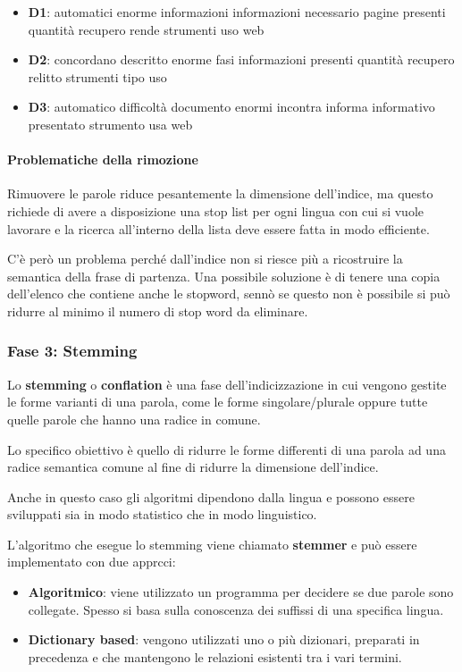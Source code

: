 \begin{itemize}
	\item \textbf{D1}: automatici enorme informazioni informazioni necessario pagine presenti quantità recupero rende strumenti uso web 
	\item \textbf{D2}: concordano descritto enorme fasi informazioni presenti quantità recupero relitto strumenti tipo uso
	\item \textbf{D3}: automatico difficoltà documento enormi incontra informa informativo presentato strumento usa web
\end{itemize}

\paragraph{Problematiche della rimozione}

Rimuovere le parole riduce pesantemente la dimensione dell'indice, ma questo richiede di avere a disposizione una stop list per ogni lingua con cui si vuole lavorare e la ricerca all'interno della lista deve essere fatta in modo efficiente.

C'è però un problema perché dall'indice non si riesce più a ricostruire la semantica della frase di partenza. Una possibile soluzione è di tenere una copia dell'elenco che contiene anche le stopword, sennò se questo non è possibile si può ridurre al minimo il numero di stop word da eliminare.

\subsubsection{Fase 3: Stemming}

Lo \textbf{stemming} o \textbf{conflation} è una fase dell'indicizzazione in cui vengono gestite le forme varianti di una parola, come le forme singolare/plurale oppure tutte quelle parole che hanno una radice in comune.

Lo specifico obiettivo è quello di ridurre le forme differenti di una parola ad una radice semantica comune al fine di ridurre la dimensione dell'indice.

Anche in questo caso gli algoritmi dipendono dalla lingua e possono essere sviluppati sia in modo statistico che in modo linguistico.

L'algoritmo che esegue lo stemming viene chiamato \textbf{stemmer} e può essere implementato con due apprcci:

\begin{itemize}
	\item \textbf{Algoritmico}: viene utilizzato un programma per decidere se due parole sono collegate. Spesso si basa sulla conoscenza dei suffissi di una specifica lingua.
	\item \textbf{Dictionary based}: vengono utilizzati uno o più dizionari, preparati in precedenza e che mantengono le relazioni esistenti tra i vari termini.
\end{itemize}

